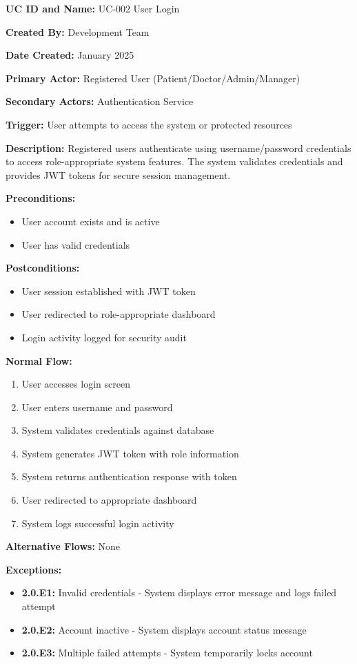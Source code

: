 \documentclass[12pt,a4paper]{article}
\begin{document}
\textbf{UC ID and Name:} UC-002 User Login

\textbf{Created By:} Development Team

\textbf{Date Created:} January 2025

\textbf{Primary Actor:} Registered User (Patient/Doctor/Admin/Manager)

\textbf{Secondary Actors:} Authentication Service

\textbf{Trigger:} User attempts to access the system or protected resources

\textbf{Description:} Registered users authenticate using username/password credentials to access role-appropriate system features. The system validates credentials and provides JWT tokens for secure session management.

\textbf{Preconditions:}
\begin{itemize}
    \item User account exists and is active
    \item User has valid credentials
\end{itemize}

\textbf{Postconditions:}
\begin{itemize}
    \item User session established with JWT token
    \item User redirected to role-appropriate dashboard
    \item Login activity logged for security audit
\end{itemize}

\textbf{Normal Flow:}
\begin{enumerate}
    \item User accesses login screen
    \item User enters username and password
    \item System validates credentials against database
    \item System generates JWT token with role information
    \item System returns authentication response with token
    \item User redirected to appropriate dashboard
    \item System logs successful login activity
\end{enumerate}

\textbf{Alternative Flows:} None

\textbf{Exceptions:}
\begin{itemize}
    \item \textbf{2.0.E1:} Invalid credentials - System displays error message and logs failed attempt
    \item \textbf{2.0.E2:} Account inactive - System displays account status message
    \item \textbf{2.0.E3:} Multiple failed attempts - System temporarily locks account
\end{itemize}
\end{document}
